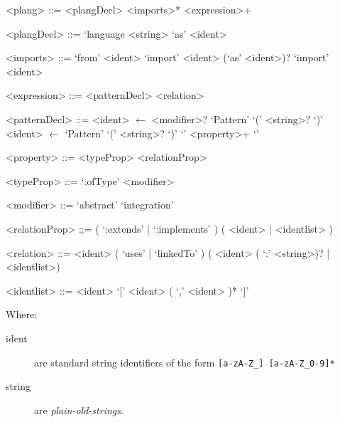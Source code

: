 
\usepackage{syntax}


\maketitle
    
\begin{grammar}
<plang> ::= <plangDecl> <imports>* <expression>+


<plangDecl> ::= `language <string> `as' <ident>


<imports> ::= `from' <ident> `import' <ident> (`as' <ident>)?
  \alt `import' <ident>


<expression> ::= <patternDecl>
\alt <relation>

<patternDecl> ::= <ident> $\leftarrow$ <modifier>? `Pattern' `(' <string>? `)'
\alt <ident> $\leftarrow$ `Pattern' `(' <string>? `)' `{' <property>+ `}'


<property> ::= <typeProp>
\alt <relationProp>


<typeProp> ::= `:ofType' <modifier>

<modifier> ::= `abstract' \alt `integration'

<relationProp> ::= ( `:extends' | `:implements' ) ( <ident> | <identlist> )

<relation> ::= <ident> ( `uses' | `linkedTo' ) ( <ident> ( `:' <string>)? | <identlist>)

<identlist> ::= <ident>  \alt `[' <ident> ( `,' <ident> )* `]'

\end{grammar}

\noindent
Where:

\begin{description}
\item[ident]
are standard string identifiers of the form \verb+[a-zA-Z_] [a-zA-Z_0-9]*+

\item[string]
are \emph{plain-old-strings}.
\end{description}

